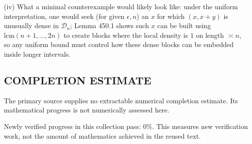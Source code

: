(iv) What a minimal counterexample would likely look like: under the uniform interpretation, one would seek (for given $\epsilon,n$) an $x$ for which $(x,x+y)$ is unusually dense in $\mathcal D_n$; Lemma 450.1 shows such $x$ can be built using $\mathrm{lcm}(n+1,\dots,2n)$ to create blocks where the local density is $1$ on length $\asymp n$, so any uniform bound must control how these dense blocks can be embedded inside longer intervals.


\subsection*{COMPLETION ESTIMATE}
The primary source supplies no extractable numerical completion estimate. Its mathematical progress is not numerically assessed here.

Newly verified progress in this collection pass: $0\%$. This measures new verification work, not the amount of mathematics achieved in the reused text.
